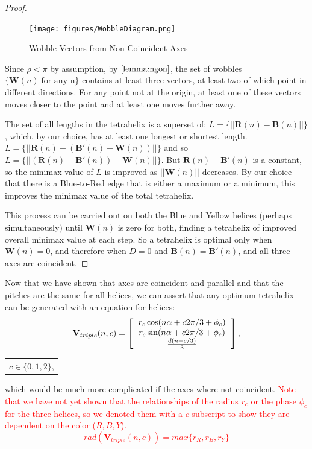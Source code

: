 \documentclass[twocolumn,10pt]{asme2ej}
\renewcommand{\vec}[1]{\mathbf{#1}}
\newcommand{\highlighttext}[1] {\textcolor{red}{#1}}
\begin{document}
\begin{proof}
  \begin{figure}
     \centering
     \texttt{[image: figures/WobbleDiagram.png]}
     \caption{Wobble Vectors from Non-Coincident Axes}
  \label{fig:wobble}
\end{figure}

  Since $\rho < \pi$ by assumption, by $\cref{lemma:ngon}$,
  the set of wobbles $\{\vec{W}(n) | \text{for any n}\}$
  contains at least three vectors,
  at least two of which point in different directions.
  For any point not at the origin, at least one of these vectors moves closer to the
  point and at least one moves further away.

    The set of all lengths in the tetrahelix is a superset of:
    $L = \{|| \vec{R}(n) - \vec{B}(n)||\}$, which, by our choice,
    has at least one longest or shortest
    length.
    $L = \{|| \vec{R}(n) - (\vec{B'}(n) + \vec{W}(n))||\}$ and so
    $L = \{|| (\vec{R}(n) - \vec{B'}(n)) - \vec{W}(n)||\}$.
    But $\vec{R}(n) - \vec{B'}(n)$ is a constant, so the minimax value of $L$ is improved as $||\vec{W}(n)||$
    decreases.  
    By our choice that there is a Blue-to-Red edge that is either a maximum or a minimum,
    this improves the minimax value of the total tetrahelix.
    
    This process can be carried out on both the Blue and Yellow helices
    (perhaps simultaneously) until $\vec{W}(n)$ is
    zero for both, finding a tetrahelix of improved overall minimax value at each step.
    So a tetrahelix is optimal only when $\vec{W}(n) = 0$, and therefore when $D=0$ and
    $\vec{B}(n) = \vec{B'}(n)$, and all three axes are coincident.
\end{proof}

Now that we have shown that axes are coincident and parallel and that the pitches
are the same for all helices, we can assert that any optimum tetrahelix can
be generated with an equation for helices:
\begin{equation}
\label{eq:triple}
\vec{V}_{triple}(n,c) =
\left [
  \begin{tabular}{c}
   $ r_c \cos(n \alpha +  c 2 \pi /3 + \phi_c)$\\
   $ r_c \sin(n \alpha +  c 2 \pi /3 + \phi_c) $\\
   $ \frac{d(n +c / 3)}{3}   $
  \end{tabular}
  \right ],
\end{equation}
\begin{tabular}{l}
  $c \in \{0,1,2\}$,
  \end{tabular}      
which would be much more complicated if the axes where not coincident.
\highlighttext{
Note that we have not yet shown that the relationships of the radius $r_c$ or
the phase $\phi_c$ for the three helices, so we denoted them with a $c$ subscript to show
they are dependent on the color ($R,B,Y$). 
\[
rad(\vec{V}_{triple}(n,c)) = max \{r_R, r_B, r_Y\}
\]
}
\end{document}
